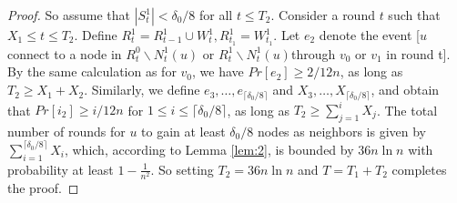 \documentclass[
10pt, %
a4paper, %
oneside, %
headinclude,footinclude, %
BCOR5mm, %
]{scrartcl}
\begin{document}
\begin{proof}
	So assume that $|S_t^1| < \delta_0 / 8$ for all $t \leq T_2$. Consider a round $t$ such that $X_1 \leq t \leq T_2$. 
	Define $R_t^1 = R_{t-1}^1 \cup W_t^1, R_{t_1}^1 = W_{t_1}^1$. Let $e_2$ denote the event [$u$ connect to a node in $R_t^0 \backslash N_t^1(u)$ or $R_t^1 \backslash N_t^1(u)$through $v_0$ or $v_1$ in round t]. By the same calculation as for $v_0$, we have $Pr[e_2] \geq 2/12n$, as long as $T_2 \geq X_1 + X_2$. Similarly, we define $e_3, \ldots, e_{\lceil \delta_0/8 \rceil}$ and $X_3, \ldots, X_{\lceil \delta_0/8 \rceil}$, and obtain that  $Pr[i_2] \geq i/12n$ for $ 1 \leq i \leq \lceil \delta_0/8 \rceil$, as long as $T_2 \geq \sum_{j = 1}^{i}X_j$. The total number of rounds for $u$ to gain at least $\delta_0/8$ nodes as neighbors is given by $\sum_{i = 1}^{\lceil \delta_0/8 \rceil}X_i$, which, according to Lemma \ref{lem:2}, is bounded by $36n\ln n$ with probability at least $1 - \frac{1}{n^2}$. So setting $T_2 = 36n\ln n$ and $T = T_1 + T_2$ completes the proof.	
\end{proof}
\end{document}

